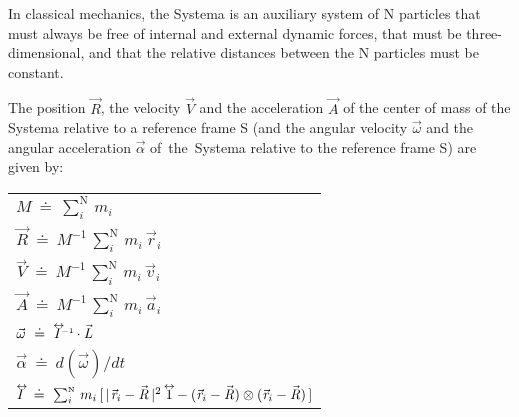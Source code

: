\documentclass[10pt]{article}
\begin{document}
\par \bigskip \noindent In classical mechanics, the Systema is an auxiliary system of {\small N} particles that must always be free of internal and external dynamic forces, that must be three-dimensional, and that the relative distances between the {\small N} particles must be constant.

\par \bigskip \noindent The position ${\vec{\mathit{R}}}$, the velocity ${\vec{\mathit{V}}}$ and the acceleration ${\vec{\mathit{A}}}$ of the center of mass of the Systema relative to a reference frame S (and the angular velocity ${\vec{\omega}}$ and the angular acceleration ${\vec{\alpha}}$ \hbox {of the Systema} relative to the reference frame S) are given by:

\par \bigskip\smallskip \hspace{-2.40em} \begin{tabular}{l}
${\mathit{M}} ~\doteq~ \sum_i^{\scriptscriptstyle{\mathrm{N}}} \, m_i$ \vspace{+1.20em} \\
${\vec{\mathit{R}}} ~\doteq~ {\mathit{M}}^{\scriptscriptstyle -1} \, \sum_i^{\scriptscriptstyle{\mathrm{N}}} \, m_i \, {\vec{\mathit{r}}_{i}}$ \vspace{+1.20em} \\
${\vec{\mathit{V}}} ~\doteq~ {\mathit{M}}^{\scriptscriptstyle -1} \, \sum_i^{\scriptscriptstyle{\mathrm{N}}} \, m_i \, {\vec{\mathit{v}}_{i}}$ \vspace{+1.20em} \\
${\vec{\mathit{A}}} ~\doteq~ {\mathit{M}}^{\scriptscriptstyle -1} \, \sum_i^{\scriptscriptstyle{\mathrm{N}}} \, m_i \, {\vec{\mathit{a}}_{i}}$ \vspace{+1.20em} \\
${\vec{\omega}} ~\doteq~ {\mathit{I}}^{\scriptscriptstyle -1}{\vphantom{\sum_1^2}}^{\hspace{-1.500em}\leftrightarrow}\hspace{+0.600em} \cdot {\vec{\mathit{L}}}$ \vspace{+1.20em} \\
${\vec{\alpha}} ~\doteq~ d({\vec{\omega}})/dt$ \vspace{+1.20em} \\
${\mathit{I}}{\vphantom{\sum_1^2}}^{\hspace{-0.555em}\leftrightarrow}\hspace{-0.210em} ~\doteq~ \sum_i^{\scriptscriptstyle{\mathrm{N}}} \, m_i \, [ \, |\hspace{+0.090em}{\vec{\mathit{r}}_{i}} - {\vec{\mathit{R}}}\,|^2 \hspace{+0.309em} {\mathrm{1}}{\vphantom{\sum_1^2}}^{\hspace{-0.639em}\leftrightarrow}\hspace{-0.129em} - ({\vec{\mathit{r}}_{i}} - {\vec{\mathit{R}}}) \otimes ({\vec{\mathit{r}}_{i}} - {\vec{\mathit{R}}}) \, ]$ \vspace{+1.20em} \\

\end{tabular}
\end{document}
